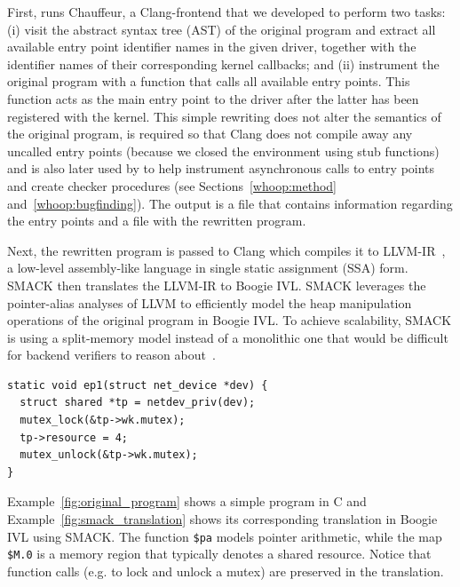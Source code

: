 First, \whoop runs Chauffeur, a Clang-frontend that we developed to perform two tasks: (i) visit the abstract syntax tree (AST) of the original program and extract all available entry point identifier names in the given driver, together with the identifier names of their corresponding kernel callbacks; and (ii) instrument the original program with a function that calls all available entry points. This function acts as the main entry point to the driver after the latter has been registered with the kernel. This simple rewriting does not alter the semantics of the original program, is required so that Clang does not compile away any uncalled entry points (because we closed the environment using stub functions) and is also later used by \whoop to help instrument asynchronous calls to entry points and create checker procedures (see Sections~\ref{whoop:method} and~\ref{whoop:bugfinding}). The output is a file that contains information regarding the entry points and a file with the rewritten program.

Next, the rewritten program is passed to Clang which compiles it to LLVM-IR~\cite{lattner2004llvm}, a low-level assembly-like language in single static assignment (SSA) form. SMACK then translates the LLVM-IR to Boogie IVL. SMACK leverages the pointer-alias analyses of LLVM to efficiently model the heap manipulation operations of the original program in Boogie IVL. To achieve scalability, SMACK is using a split-memory model instead of a monolithic one that would be difficult for backend verifiers to reason about~\cite{rakamaric2009scalable}.

\begin{lstlisting}[caption = Simple networking entry point in C, label = fig:original_program]
static void ep1(struct net_device *dev) {
  struct shared *tp = netdev_priv(dev);
  mutex_lock(&tp->wk.mutex);
  tp->resource = 4;
  mutex_unlock(&tp->wk.mutex);
}
\end{lstlisting}

Example~\ref{fig:original_program} shows a simple program in C and Example~\ref{fig:smack_translation} shows its corresponding translation in Boogie IVL using SMACK. The function \texttt{\$pa} models pointer arithmetic, while the map \texttt{\$M.0} is a memory region that typically denotes a shared resource. Notice that function calls (e.g. to lock and unlock a mutex) are preserved in the translation.


